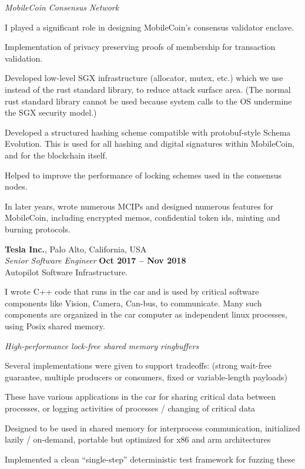 \documentclass[margin,line]{resume}
\begin{document}
\begin{resume}
    \textsl{MobileCoin Consensus Network}
    \begin{list2}
    \item{I played a significant role in designing MobileCoin's consensus validator enclave.}
    \item{Implementation of privacy preserving proofs of membership for transaction validation.}
    \item{Developed low-level SGX infrastructure (allocator, mutex, etc.) which we use instead of the rust standard library, to reduce attack surface area. (The normal rust standard library cannot be used because system calls to the OS undermine the SGX security model.)}
    \item{Developed a structured hashing scheme compatible with protobuf-style Schema Evolution. This is used for all hashing and digital signatures within MobileCoin, and for the blockchain itself.}
    \item{Helped to improve the performance of locking schemes used in the consensus nodes.}
    \item{In later years, wrote numerous MCIPs and designed numerous features for MobileCoin, including encrypted memos, confidential token ids, minting and burning protocols.}
    \end{list2}

    \textbf{Tesla Inc.}, Palo Alto, California, USA \vspace{2mm}\\\vspace{1mm}%
    \textsl{Senior Software Engineer} \hfill \textbf{Oct 2017 -- Nov 2018}\\
    Autopilot Software Infrastructure.
    
    I wrote C++ code that runs in the car and is used by critical software components like
    Vision, Camera, Can-bus, to communicate. Many such components are organized
    in the car computer as independent linux processes, using Posix shared memory.

    \textsl{High-performance lock-free shared memory ringbuffers}
    \begin{list2}
    \item{Several implementations were given to support tradeoffs: (strong wait-free guarantee, multiple producers or consumers, fixed or variable-length payloads)}
    \item{These have various applications in the car for sharing critical data between processes, or logging activities of processes / changing of critical data}
    \item{Designed to be used in shared memory for interprocess communication, initialized lazily / on-demand, portable but optimized for x86 and arm architectures}
    \item{Implemented a clean ``single-step'' deterministic test framework for fuzzing these}
    \end{list2}


\end{resume}
\end{document}
